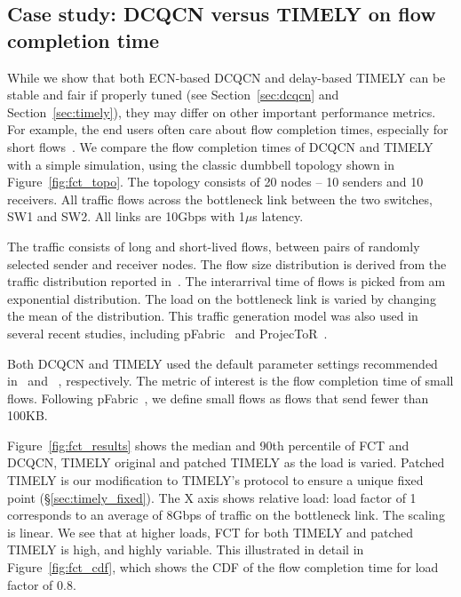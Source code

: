 \subsection {Case study: DCQCN versus TIMELY on flow completion time}
\label{sec:fct}

While we show that both ECN-based DCQCN and delay-based TIMELY can be 
stable and fair if properly tuned (see Section~\ref{sec:dcqcn} and 
Section~\ref{sec:timely}), they may differ on other important performance
metrics. For example, the end users often care about flow completion
times, especially for short flows~\cite{rcp}. We compare the flow completion 
times of DCQCN and TIMELY with 
a simple simulation, using the classic dumbbell topology shown in
Figure~\ref{fig:fct_topo}. The topology consists of 20 nodes -- 10 senders and
10 receivers. All traffic flows across the bottleneck link between the two
switches, SW1 and SW2. All links are 10Gbps with 1$\mu$s latency.

The traffic consists  of long and short-lived flows, between pairs of randomly
selected sender and receiver nodes. The flow size distribution is derived from
the traffic distribution reported in~\cite{dctcp}. The interarrival time of
flows is picked from am exponential distribution. The load on the bottleneck
link is varied by changing the mean of the distribution. This traffic generation
model was also used in several recent studies, including pFabric~\cite{pfabric}
and ProjecToR~\cite{projector}. 

Both DCQCN and TIMELY used the default parameter settings recommended
in~\cite{dcqcn} and ~\cite{timely}, respectively. 
The metric of interest is the flow completion time of small flows. Following 
pFabric~\cite{pfabric}, we define small flows as flows that send fewer than 100KB. 

Figure~\ref{fig:fct_results} shows the median and 90th percentile of FCT and
DCQCN, TIMELY original and patched TIMELY as the load is varied. Patched TIMELY is our 
modification to TIMELY's protocol to ensure a unique fixed point (\S\ref{sec:timely_fixed}). 
The X axis shows relative load: load factor of 1 corresponds to an average of 8Gbps of traffic 
on the bottleneck link. The scaling is linear. We see that at higher loads, FCT for both TIMELY 
and patched TIMELY is high, and highly variable. This illustrated in detail in 
Figure~\ref{fig:fct_cdf}, which shows the CDF of the flow completion time for
load factor of 0.8. 

